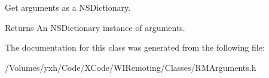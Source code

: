 Get arguments as a NSDictionary. \begin{DoxyReturn}{Returns}
An NSDictionary instance of arguments. 
\end{DoxyReturn}


The documentation for this class was generated from the following file:\begin{DoxyCompactItemize}
\item 
/Volumes/yxh/Code/XCode/WIRemoting/Classes/RMArguments.h\end{DoxyCompactItemize}
